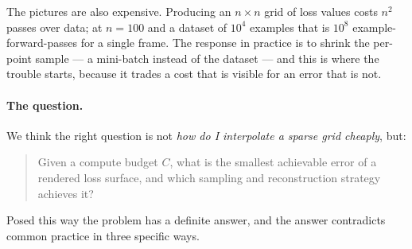 \documentclass[11pt]{article}
\theoremstyle{definition}
\begin{document}
The pictures are also expensive. Producing an $n\times n$ grid of loss values costs
$n^2$ passes over data; at $n=100$ and a dataset of $10^4$ examples that is $10^8$
example-forward-passes for a single frame. The response in practice is to shrink the
per-point sample --- a mini-batch instead of the dataset --- and this is where the
trouble starts, because it trades a cost that is visible for an error that is not.

\paragraph{The question.} We think the right question is not \emph{how do I interpolate
a sparse grid cheaply}, but:

\begin{quote}
Given a compute budget $C$, what is the smallest achievable error of a rendered loss
surface, and which sampling and reconstruction strategy achieves it?
\end{quote}

Posed this way the problem has a definite answer, and the answer contradicts common
practice in three specific ways.
\end{document}

